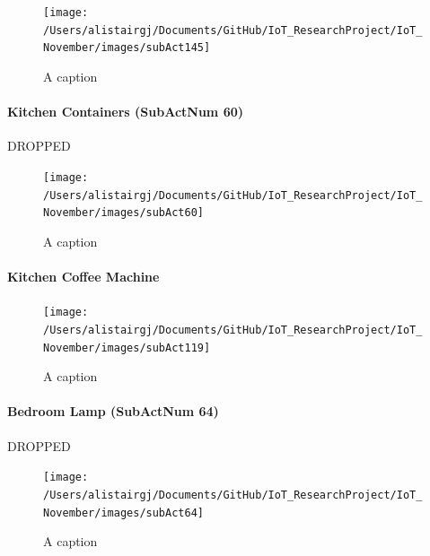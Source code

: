 \documentclass[11pt,]{article}
\let\oldparagraph\paragraph
\renewcommand{\paragraph}[1]{\oldparagraph{#1}\mbox{}}
\begin{document}
\begin{figure}[H]

{\centering \texttt{[image: /Users/alistairgj/Documents/GitHub/IoT\_ResearchProject/IoT\_November/images/subAct145]} 

}

\caption{A caption}\label{fig:subAct145}
\end{figure}

\hypertarget{kitchen-containers-subactnum-60}{%
\paragraph{Kitchen Containers (SubActNum
60)}\label{kitchen-containers-subactnum-60}}

DROPPED

\begin{figure}[H]

{\centering \texttt{[image: /Users/alistairgj/Documents/GitHub/IoT\_ResearchProject/IoT\_November/images/subAct60]} 

}

\caption{A caption}\label{fig:subAct60}
\end{figure}

\hypertarget{kitchen-coffee-machine}{%
\paragraph{Kitchen Coffee Machine}\label{kitchen-coffee-machine}}

\begin{figure}[H]

{\centering \texttt{[image: /Users/alistairgj/Documents/GitHub/IoT\_ResearchProject/IoT\_November/images/subAct119]} 

}

\caption{A caption}\label{fig:subAct119}
\end{figure}

\hypertarget{bedroom-lamp-subactnum-64}{%
\paragraph{Bedroom Lamp (SubActNum
64)}\label{bedroom-lamp-subactnum-64}}

DROPPED

\begin{figure}[H]

{\centering \texttt{[image: /Users/alistairgj/Documents/GitHub/IoT\_ResearchProject/IoT\_November/images/subAct64]} 

}

\caption{A caption}\label{fig:subAct64}
\end{figure}
\end{document}
